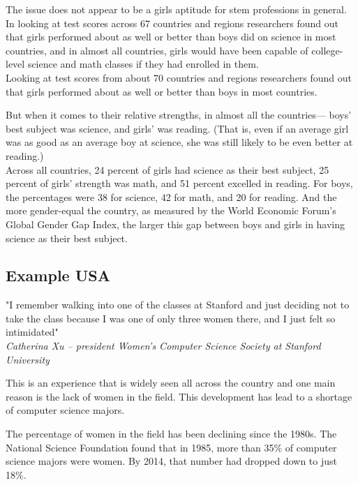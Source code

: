 	The issue does not appear to be a girls aptitude for stem professions in general. In looking at test scores across 67 countries and regions researchers found out that girls performed about as well or better than boys did on science in most countries, and in almost all countries, girls would have been capable of college-level science and math classes if they had enrolled in them.\\
	
	Looking at test scores from about 70 countries and regions researchers found out that girls performed about as well or better than boys in most countries.
		
	But when it comes to their relative strengths, in almost all the countries— boys’ best subject was science, and girls’ was reading. (That is, even if an average girl was as good as an average boy at science, she was still likely to be even better at reading.)\\
	\newline
	Across all countries, 24 percent of girls had science as their best subject, 25 percent of girls’ strength was math, and 51 percent excelled in reading. For boys, the percentages were 38 for science, 42 for math, and 20 for reading. And the more gender-equal the country, as measured by the World Economic Forum’s Global Gender Gap Index, the larger this gap between boys and girls in having science as their best subject.
	
	\subsection{Example USA}
	
	"I remember walking into one of the classes at Stanford and just deciding not to take the class because I was one of only three women there, and I just felt so intimidated"\cite{tusa1}\\
	\textit{Catherina Xu – president Women’s Computer Science Society at Stanford University}
	\newline
	
	This is an experience that is widely seen all across the country and one main reason is the lack of women in the field. This development has lead to a shortage of computer science majors.
	
	The percentage of women in the field has been declining since the 1980s. The National Science Foundation found that in 1985, more than 35\% of computer science majors were women. By 2014, that number had dropped down to just 18\%.\\
	
